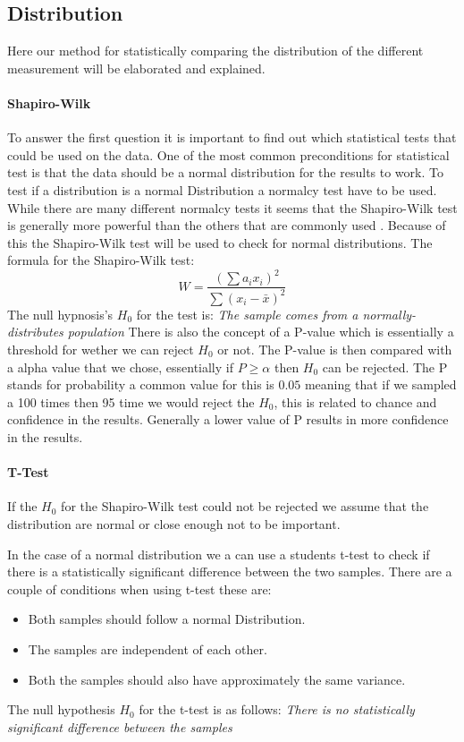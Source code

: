 \subsection{Distribution}
Here our method for statistically comparing the distribution of the different measurement will be elaborated and explained.
\paragraph{Shapiro-Wilk}
To answer the first question it is important to find out which statistical tests that could be used on the data. One of the most common preconditions for statistical test is that the data should be a normal distribution for the results to work. To test if a distribution is a normal Distribution a normalcy test have to be used. While there are many different normalcy tests it seems that the Shapiro-Wilk test is generally more powerful than the others that are commonly used \cite{razali2011power}. Because of this the Shapiro-Wilk test will be used to check for normal distributions. The formula for the Shapiro-Wilk test:
$$W=\frac{( \sum{a_i x_i} )^2}{\sum{(x_i - \bar{x})^2}}$$
The null hypnosis's $H_0$ for the test is:
\textit{The sample comes from a normally-distributes population}
There is also the concept of a P-value which is essentially a threshold for wether we can reject $H_0$ or not. The P-value is then compared with a alpha value that we chose, essentially if $P \geq \alpha$ then $H_0$ can be rejected. The P stands for probability a common value for this is $0.05$ meaning that if we sampled a 100 times then 95 time we would reject the $H_0$, this is related to chance and confidence in the results. Generally a lower value of P results in more confidence in the results.
\paragraph{T-Test}
If the $H_0$ for the Shapiro-Wilk test could not be rejected we assume that the distribution are normal or close enough not to be important.

In the case of a normal distribution we a can use a students t-test to check if there is a statistically significant difference between the two samples. There are a couple of conditions when using t-test these are:
\begin{itemize}
    \item Both samples should follow a normal Distribution.
    \item The samples are independent of each other.
    \item Both the samples should also have approximately the same variance.
\end{itemize}
The null hypothesis $H_0$ for the t-test is as follows: \textit{There is no statistically significant difference between the samples}

